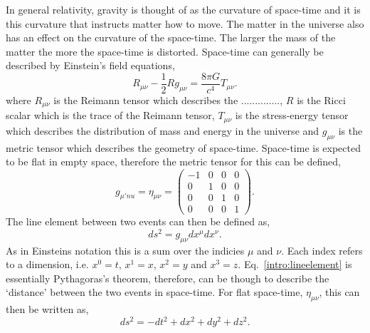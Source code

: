 In general relativity, gravity is thought of as the curvature of space-time and it is this curvature that instructs matter how to move. 
The matter in the universe also has an effect on the curvature of the space-time.
The larger the mass of the matter the more the space-time is distorted.
Space-time can generally be described by Einstein's field equations,
\begin{equation}
    R_{\mu \nu} - \frac{1}{2}R g_{\mu \nu} = \frac{8 \pi G}{c^4}T_{\mu \nu}.
\end{equation}
where $R_{\mu \nu}$ is the Reimann tensor which describes the .............., $R$ is the Ricci scalar which is the trace of the Reimann tensor, $T_{\mu \nu}$ is the stress-energy tensor which describes the distribution of mass and energy in the universe and $g_{\mu \nu}$ is the metric tensor which describes the geometry of space-time.
Space-time is expected to be flat in empty space, therefore the metric tensor for this can be defined,
\begin{equation}
g_{\mu 'nu} = \eta_{\mu \nu} = \left(
\begin{matrix}
-1 & 0 & 0 & 0 \\
0 & 1 & 0 & 0 \\
0 & 0 & 1 & 0 \\
0 & 0 & 0 & 1 
\end{matrix}
\right).
\end{equation}
The line element between two events can then be defined as,
\begin{equation}
\label{intro:lineelement}
    ds^2 = g_{\mu \nu} dx^{\mu}dx^{\nu}.
\end{equation}
As in Einsteins notation this is a sum over the indicies $\mu$ and $\nu$. Each index refers to a dimension, i.e. $x^0 = t$, $x^1=x$, $x^2=y$ and $x^3=z$. 
Eq.~\ref{intro:lineelement} is essentially Pythagoras's theorem, therefore, can be though to describe the `distance' between the two events in space-time.
For flat space-time, $\eta_{\mu\nu}$, this can then be written as,
\begin{equation}
    ds^2 = -dt^2 + dx^2 + dy^2 + dz^2.
\end{equation}

